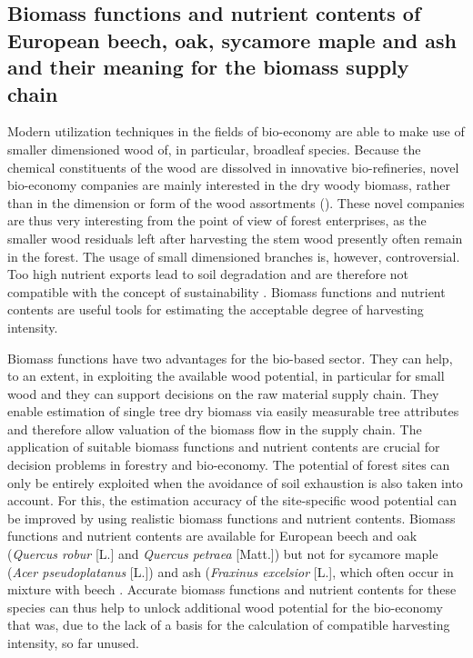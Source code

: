 \subsection{Biomass functions and nutrient contents of European beech, oak, sycamore maple and ash and their meaning for the biomass supply chain}
\label{subsec:intro:struct:bm}
Modern utilization techniques in the fields of bio-economy are able to make use of smaller dimensioned wood of, in particular, broadleaf species. Because the chemical constituents of the wood are dissolved in innovative bio-refineries, novel bio-economy companies are mainly interested in the dry woody biomass, rather than in the dimension or form of the wood assortments (\citep{ekman_2013}). These novel companies are thus very interesting from the point of view of forest enterprises, as the smaller wood residuals left after harvesting the stem wood presently often remain in the forest. The usage of small dimensioned branches is, however, controversial. Too high nutrient exports lead to soil degradation and are therefore not compatible with the concept of sustainability \citep[p. 261]{pretzsch_2014}. Biomass functions and nutrient contents are useful tools for estimating the acceptable degree of harvesting intensity.

Biomass functions have two advantages for the bio-based sector. They can help, to an extent, in exploiting the available wood potential, in particular for small wood and they can support decisions on the raw material supply chain. They enable estimation of single tree dry biomass via easily measurable tree attributes and therefore allow valuation of the biomass flow in the supply chain. The application of suitable biomass functions and nutrient contents are crucial for decision problems in forestry and bio-economy. The potential of forest sites can only be entirely exploited when the avoidance of soil exhaustion is also taken into account. For this, the estimation accuracy of the site-specific wood potential can be improved by using realistic biomass functions and nutrient contents. Biomass functions and nutrient contents are available for European beech and oak (\textit{Quercus robur} [L.] and \textit{Quercus petraea} [Matt.]) but not for sycamore maple (\textit{Acer pseudoplatanus} [L.]) and ash (\textit{Fraxinus excelsior} [L.], which often occur in mixture with beech \citep{ti_2014}. Accurate biomass functions and nutrient contents for these species can thus help to unlock additional wood potential for the bio-economy that was, due to the lack of a basis for the calculation of compatible harvesting intensity, so far unused.

